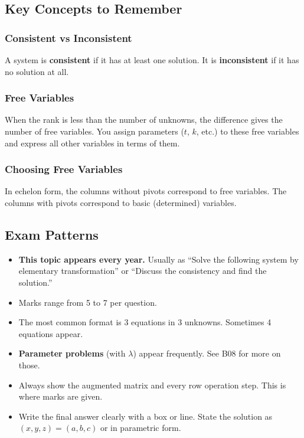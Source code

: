 \documentclass[
]{article}
\providecommand{\tightlist}{%
  \setlength{\itemsep}{0pt}\setlength{\parskip}{0pt}}
\begin{document}
\subsection{Key Concepts to Remember}\label{key-concepts-to-remember}

\subsubsection{Consistent vs
Inconsistent}\label{consistent-vs-inconsistent}

A system is \textbf{consistent} if it has at least one solution. It is
\textbf{inconsistent} if it has no solution at all.

\subsubsection{Free Variables}\label{free-variables}

When the rank is less than the number of unknowns, the difference gives
the number of free variables. You assign parameters (\(t\), \(k\), etc.)
to these free variables and express all other variables in terms of
them.

\subsubsection{Choosing Free Variables}\label{choosing-free-variables}

In echelon form, the columns without pivots correspond to free
variables. The columns with pivots correspond to basic (determined)
variables.

\subsection{Exam Patterns}\label{exam-patterns-22}

\begin{itemize}
\tightlist
\item
  \textbf{This topic appears every year.} Usually as ``Solve the
  following system by elementary transformation'' or ``Discuss the
  consistency and find the solution.''
\item
  Marks range from 5 to 7 per question.
\item
  The most common format is 3 equations in 3 unknowns. Sometimes 4
  equations appear.
\item
  \textbf{Parameter problems} (with \(\lambda\)) appear frequently. See
  B08 for more on those.
\item
  Always show the augmented matrix and every row operation step. This is
  where marks are given.
\item
  Write the final answer clearly with a box or line. State the solution
  as \((x, y, z) = (a, b, c)\) or in parametric form.
\end{itemize}
\end{document}
